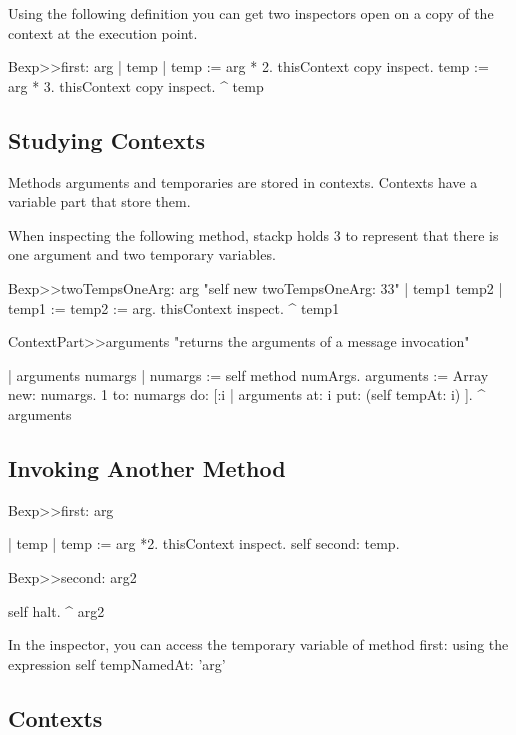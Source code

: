 \documentclass[a4paper,10pt,twoside]{book}
\begin{document}
Using the following definition you can get two inspectors open on a copy of the context
at the execution point. 
\begin{code}
Bexp>>first: arg
	| temp | 	
	temp := arg * 2.
	thisContext copy inspect.
	temp := arg * 3.
	thisContext copy inspect.
	^ temp
\end{code}

\subsection{Studying Contexts}
Methods arguments and temporaries are stored in contexts. Contexts have a variable part that 
store them. 

When inspecting the following method, stackp holds 3 to represent that there is one argument
and two temporary variables.

\begin{code}{}
Bexp>>twoTempsOneArg: arg
	"self new twoTempsOneArg: 33"
	| temp1 temp2 | 	
	temp1 := temp2 := arg.
	thisContext inspect.
	^ temp1
\end{code}


\begin{code}{}
ContextPart>>arguments
	"returns the arguments of a message invocation"
	
	| arguments numargs |
	numargs :=  self method numArgs.
	arguments := Array new: numargs.
	1 to: numargs do: [:i | arguments at: i put: (self tempAt: i) ].
	^ arguments
\end{code}






\subsection{Invoking Another Method}
\begin{code}{}
Bexp>>first: arg

	| temp | 	
	temp := arg *2.
	thisContext inspect.
	self second: temp.

Bexp>>second: arg2
	
	self halt.
	^ arg2
\end{code}

In the inspector, you can access the temporary variable of method first: using the expression self tempNamedAt: 'arg'







\subsection{Contexts}
\end{document}
